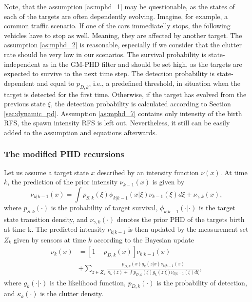 Note, that the assumption \ref{as:mphd_1} may be questionable, as the states of each of the targets are often
dependently
evolving.
Imagine,
for example, a common traffic scenario. If one of the cars immediatelly stops, the following vehicles have to stop as
well. Meaning, they are affected by another target.
The assumption \ref{as:mphd_2} is reasonable, especially if we consider that the clutter rate should be very low in
our
scenarios.
The survival probability is state-independent as in the GM-PHD filter and should be set high, as the targets are
expected
to survive to the next time step.
The detection probability is state-dependent and equal to $p_{D,k}$, i.e., a predefined threshold, in situation when
the target is detected for the first time. Otherwise, if the target has evolved from the previous state $\xi$, the
detection probability is calculated according to Section \ref{sec:dynamic_pd}.
Assumption \ref{as:mphd_7} contains only intensity of the birth RFS, the spawn intensity RFS is left out.
Nevertheless, it still can be easily added to the assumption
and equations afterwards.

\subsubsection{The modified PHD recursions}
Let us assume a target state $x$ described by an intensity function $\nu(x)$. At time $k$, the prediction of the prior
intensity $\nu_{k-1}(x)$ is given by
\begin{equation}
  \nu_{k|k-1}(x) = \int p_{S,k}(\xi)\phi_{k|k-1}(x|\xi)\nu_{k-1}(\xi)d\xi + \nu_{\gamma,k}(x), \label{eq:mphdPrior}
\end{equation}
where $p_{S,k}(\cdot)$ is the probability of target survival, $\phi_{k|k-1}(\cdot|\cdot)$ is the target state transition density, and $\nu_{\gamma,k}(\cdot)$ denotes the prior PHD of the targets birth at time k.
The predicted intensity $\nu_{k|k-1}$ is then updated by the measurement set $Z_k$ given by sensors at time $k$ according to the Bayesian update
\begin{equation}
  \begin{aligned}
    \nu_k(x) &= [1 - p_{D,k}(x)]\nu_{k|k-1}(x) \\
    &+ \sum_{z \in Z_k}\frac{p_{D,k}(x) g_k(z|x) \nu_{k|k-1}(x)}{\kappa_k(z) + \int p_{D,k}(\xi) g_k(z|\xi) \nu_{k|
    k-1}(\xi)d\xi}, \label{eq:mphdPosterior}
  \end{aligned}
\end{equation}
where $g_k(\cdot|\cdot)$ is the likelihood function, $p_{D,k}(\cdot)$ is the probability of detection, and $\kappa_k(\cdot)$ is the clutter density.

